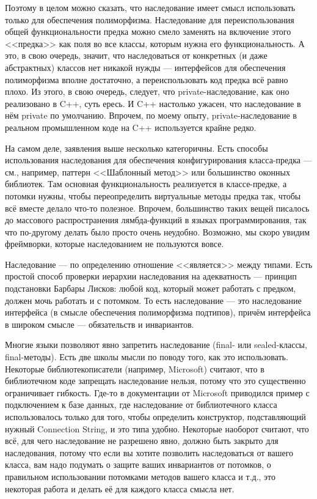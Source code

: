 \documentclass{../../text-style}
\begin{document}
Поэтому в целом можно сказать, что наследование имеет смысл использовать только для обеспечения полиморфизма. Наследование для переиспользования общей функциональности предка можно смело заменять на включение этого <<предка>> как поля во все классы, которым нужна его функциональность. А это, в свою очередь, значит, что наследоваться от конкретных (и даже абстрактных) классов нет никакой нужды --- интерфейсов для обеспечения полиморфизма вполне достаточно, а переиспользовать код предка всё равно плохо. Из этого, в свою очередь, следует, что private-наследование, как оно реализовано в C++, суть ересь. И C++ настолько ужасен, что наследование в нём private по умолчанию. Впрочем, по моему опыту, private-наследование в реальном промышленном коде на C++ используется крайне редко.

На самом деле, заявления выше несколько категоричны. Есть способы использования наследования для обеспечения конфигурирования класса-предка --- см., например, паттерн <<Шаблонный метод>> или большинство оконных библиотек. Там основная функциональность реализуется в классе-предке, а потомки нужны, чтобы переопределить виртуальные методы предка так, чтобы всё вместе делало что-то полезное. Впрочем, большинство таких вещей писалось до массового распространения лямбда-функций в языках программирования, так что по-другому делать было просто очень неудобно. Возможно, мы скоро увидим фреймворки, которые наследованием не пользуются вовсе.

Наследование --- по определению отношение <<является>> между типами. Есть простой способ проверки иерархии наследования на адекватность --- принцип подстановки Барбары Лисков: любой код, который может работать с предком, должен мочь работать и с потомком. То есть наследование --- это наследование интерфейса (в смысле обеспечения полиморфизма подтипов), причём интерфейса в широком смысле --- обязательств и инвариантов.

Многие языки позволяют явно запретить наследование (final- или sealed-классы, final-методы). Есть две школы мысли по поводу того, как это использовать. Некоторые библиотекописатели (например, Microsoft) считают, что в библиотечном коде запрещать наследование нельзя, потому что это существенно ограничивает гибкость. Где-то в документации от Microsoft приводился пример с подключением к базе данных, где наследование от библиотечного класса использовалось только для того, чтобы определить конструктор, подставляющий нужный Connection String, и это типа удобно. Некоторые наоборот считают, что всё, для чего наследование не разрешено явно, должно быть закрыто для наследования, потому что если вы хотите позволить наследоваться от вашего класса, вам надо подумать о защите ваших инвариантов от потомков, о правильном использовании потомками методов вашего класса и т.д., это некоторая работа и делать её для каждого класса смысла нет.
\end{document}
